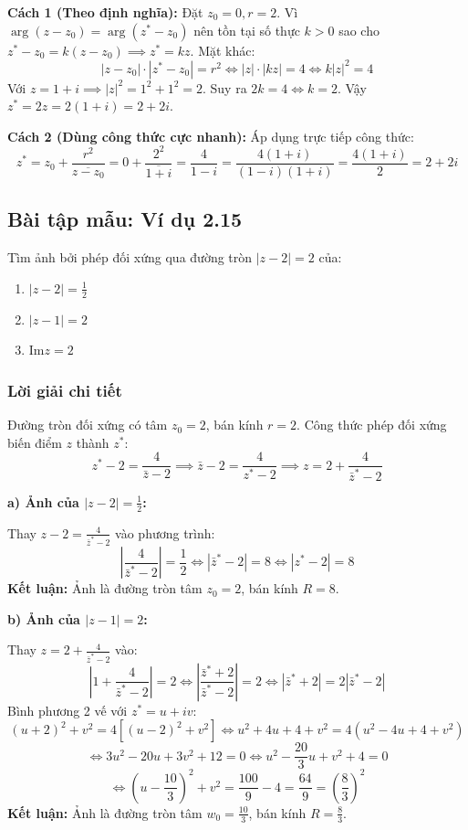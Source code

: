 \documentclass[12pt,a4paper]{article}
\begin{document}
\noindent \textbf{Cách 1 (Theo định nghĩa):}
Đặt $z_0 = 0, r = 2$.
Vì $\arg(z - z_0) = \arg(z^* - z_0)$ nên tồn tại số thực $k > 0$ sao cho $z^* - z_0 = k(z - z_0) \implies z^* = k z$.
Mặt khác:
\[ |z - z_0| \cdot |z^* - z_0| = r^2 \iff |z| \cdot |k z| = 4 \iff k |z|^2 = 4 \]
Với $z = 1 + i \implies |z|^2 = 1^2 + 1^2 = 2$. Suy ra $2k = 4 \iff k = 2$.
Vậy $z^* = 2z = 2(1 + i) = 2 + 2i$.

\bigskip
\noindent \textbf{Cách 2 (Dùng công thức cực nhanh):}
Áp dụng trực tiếp công thức:
\[ z^* = z_0 + \frac{r^2}{\overline{z - z_0}} = 0 + \frac{2^2}{\overline{1 + i}} = \frac{4}{1 - i} = \frac{4(1 + i)}{(1 - i)(1 + i)} = \frac{4(1 + i)}{2} = 2 + 2i \]

\subsection*{Bài tập mẫu: Ví dụ 2.15}
Tìm ảnh bởi phép đối xứng qua đường tròn $|z - 2| = 2$ của:
\begin{enumerate}
    \item[a)] $|z - 2| = \frac{1}{2}$
    \item[b)] $|z - 1| = 2$
    \item[c)] $\text{Im}z = 2$
\end{enumerate}

\subsubsection*{Lời giải chi tiết}

Đường tròn đối xứng có tâm $z_0 = 2$, bán kính $r = 2$.
Công thức phép đối xứng biến điểm $z$ thành $z^*$:
\[ z^* - 2 = \frac{4}{\bar{z} - 2} \implies \bar{z} - 2 = \frac{4}{z^* - 2} \implies z = 2 + \frac{4}{\bar{z}^* - 2} \]

\noindent \textbf{a) Ảnh của $|z - 2| = \frac{1}{2}$:}

Thay $z - 2 = \frac{4}{\bar{z}^* - 2}$ vào phương trình:
\[ \left| \frac{4}{\bar{z}^* - 2} \right| = \frac{1}{2} \iff |\bar{z}^* - 2| = 8 \iff |z^* - 2| = 8 \]
\textbf{Kết luận:} Ảnh là đường tròn tâm $z_0 = 2$, bán kính $R = 8$.

\bigskip
\noindent \textbf{b) Ảnh của $|z - 1| = 2$:}

Thay $z = 2 + \frac{4}{\bar{z}^* - 2}$ vào:
\[ \left| 1 + \frac{4}{\bar{z}^* - 2} \right| = 2 \iff \left| \frac{\bar{z}^* + 2}{\bar{z}^* - 2} \right| = 2 \iff |\bar{z}^* + 2| = 2 |\bar{z}^* - 2| \]
Bình phương 2 vế với $z^* = u + iv$:
\[ (u + 2)^2 + v^2 = 4[(u - 2)^2 + v^2] \iff u^2 + 4u + 4 + v^2 = 4(u^2 - 4u + 4 + v^2) \]
\[ \iff 3u^2 - 20u + 3v^2 + 12 = 0 \iff u^2 - \frac{20}{3}u + v^2 + 4 = 0 \]
\[ \iff \left(u - \frac{10}{3}\right)^2 + v^2 = \frac{100}{9} - 4 = \frac{64}{9} = \left(\frac{8}{3}\right)^2 \]
\textbf{Kết luận:} Ảnh là đường tròn tâm $w_0 = \frac{10}{3}$, bán kính $R = \frac{8}{3}$.
\end{document}

